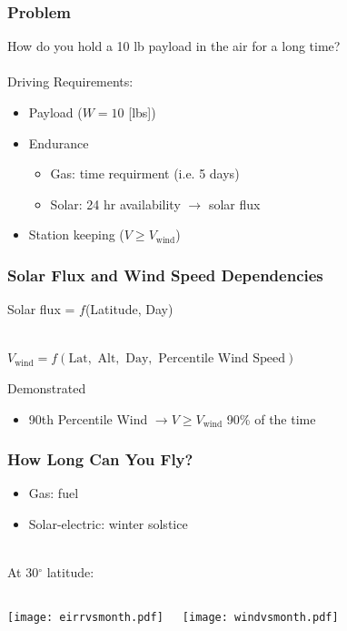 \documentclass{beamer}
\begin{document}
\begin{frame}
    \frametitle{Problem}

    How do you hold a 10 lb payload in the air for a long time? \\~\\
    \pause
    Driving Requirements:
    \begin{itemize}
        \pause
        \item Payload ($W=10$ [lbs])
        \pause
        \item Endurance
            \begin{itemize}
                \pause
                \item Gas: time requirment (i.e. 5 days)
                \pause
                \item Solar: 24 hr availability $\rightarrow$ solar flux
                \end{itemize}
        \pause
        \item Station keeping ($V \geq V_{\text{wind}}$)
    \end{itemize}

\end{frame}

\begin{frame}
    \frametitle{Solar Flux and Wind Speed Dependencies}

    \pause

    Solar flux = $f$(Latitude, Day) \\~\\

    \pause

    $ V_{\text{wind}} = f(\text{Lat}, \text{ Alt},  \text{ Day}, \text{ Percentile Wind Speed}) $

    Demonstrated \pause
    \begin{itemize}
        \item 90th Percentile Wind $\rightarrow V \geq V_{\text{wind}}$ 90\% of the time
        \end{itemize}


\end{frame}
 

\begin{frame}
    \frametitle{How Long Can You Fly?}

    \pause
    \begin{itemize}
        \item Gas: fuel 
            \pause
        \item Solar-electric: winter solstice \\~\\
    \end{itemize}

    \pause
    At 30$^{\circ}$ latitude:
    \begin{columns}
        \texttt{[image: eirrvsmonth.pdf]}
        
        \pause
        \texttt{[image: windvsmonth.pdf]}
    \end{columns}

\end{frame}
\end{document}
